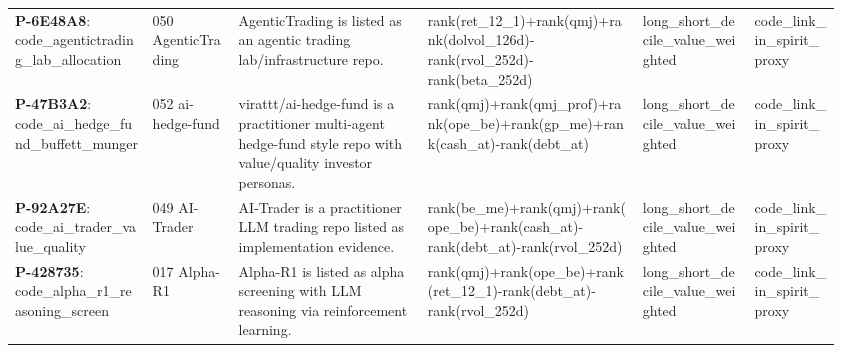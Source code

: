 \begin{longtable}{@{}L{0.16\linewidth}L{0.10\linewidth}L{0.22\linewidth}L{0.25\linewidth}L{0.13\linewidth}L{0.10\linewidth}@{}}
\textbf{P-6E48A8}: code\_\allowbreak{}agentictradi\allowbreak{}ng\_\allowbreak{}lab\_\allowbreak{}allocation & 050 AgenticTrading & AgenticTrading is listed as an agentic trading lab/infrastructure repo. & rank(\allowbreak{}ret\_\allowbreak{}12\_\allowbreak{}1)\allowbreak{}+\allowbreak{}rank(\allowbreak{}qmj)\allowbreak{}+\allowbreak{}rank(\allowbreak{}dolvol\_\allowbreak{}126d)\allowbreak{}-\allowbreak{}rank(\allowbreak{}rvol\_\allowbreak{}252d)\allowbreak{}-\allowbreak{}rank(\allowbreak{}beta\_\allowbreak{}252d)\allowbreak{} & long\_\allowbreak{}short\_\allowbreak{}decile\_\allowbreak{}value\_\allowbreak{}weighted & code\_\allowbreak{}link\_\allowbreak{}in\_\allowbreak{}spirit\_\allowbreak{}proxy \\
\textbf{P-47B3A2}: code\_\allowbreak{}ai\_\allowbreak{}hedge\_\allowbreak{}fund\_\allowbreak{}buffett\_\allowbreak{}munger & 052 ai-hedge-fund & virattt/ai-hedge-fund is a practitioner multi-agent hedge-fund style repo with value/quality investor personas. & rank(\allowbreak{}qmj)\allowbreak{}+\allowbreak{}rank(\allowbreak{}qmj\_\allowbreak{}prof)\allowbreak{}+\allowbreak{}rank(\allowbreak{}ope\_\allowbreak{}be)\allowbreak{}+\allowbreak{}rank(\allowbreak{}gp\_\allowbreak{}me)\allowbreak{}+\allowbreak{}rank(\allowbreak{}cash\_\allowbreak{}at)\allowbreak{}-\allowbreak{}rank(\allowbreak{}debt\_\allowbreak{}at)\allowbreak{} & long\_\allowbreak{}short\_\allowbreak{}decile\_\allowbreak{}value\_\allowbreak{}weighted & code\_\allowbreak{}link\_\allowbreak{}in\_\allowbreak{}spirit\_\allowbreak{}proxy \\
\textbf{P-92A27E}: code\_\allowbreak{}ai\_\allowbreak{}trader\_\allowbreak{}value\_\allowbreak{}quality & 049 AI-Trader & AI-Trader is a practitioner LLM trading repo listed as implementation evidence. & rank(\allowbreak{}be\_\allowbreak{}me)\allowbreak{}+\allowbreak{}rank(\allowbreak{}qmj)\allowbreak{}+\allowbreak{}rank(\allowbreak{}ope\_\allowbreak{}be)\allowbreak{}+\allowbreak{}rank(\allowbreak{}cash\_\allowbreak{}at)\allowbreak{}-\allowbreak{}rank(\allowbreak{}debt\_\allowbreak{}at)\allowbreak{}-\allowbreak{}rank(\allowbreak{}rvol\_\allowbreak{}252d)\allowbreak{} & long\_\allowbreak{}short\_\allowbreak{}decile\_\allowbreak{}value\_\allowbreak{}weighted & code\_\allowbreak{}link\_\allowbreak{}in\_\allowbreak{}spirit\_\allowbreak{}proxy \\
\textbf{P-428735}: code\_\allowbreak{}alpha\_\allowbreak{}r1\_\allowbreak{}reasoning\_\allowbreak{}screen & 017 Alpha-R1 & Alpha-R1 is listed as alpha screening with LLM reasoning via reinforcement learning. & rank(\allowbreak{}qmj)\allowbreak{}+\allowbreak{}rank(\allowbreak{}ope\_\allowbreak{}be)\allowbreak{}+\allowbreak{}rank(\allowbreak{}ret\_\allowbreak{}12\_\allowbreak{}1)\allowbreak{}-\allowbreak{}rank(\allowbreak{}debt\_\allowbreak{}at)\allowbreak{}-\allowbreak{}rank(\allowbreak{}rvol\_\allowbreak{}252d)\allowbreak{} & long\_\allowbreak{}short\_\allowbreak{}decile\_\allowbreak{}value\_\allowbreak{}weighted & code\_\allowbreak{}link\_\allowbreak{}in\_\allowbreak{}spirit\_\allowbreak{}proxy \\

\end{longtable}
